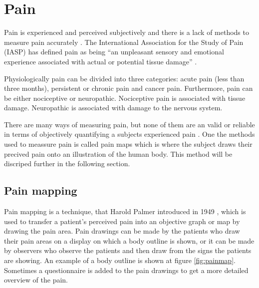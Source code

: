 \section{Pain}
Pain is experienced and perceived subjectively and there is a lack of methods to measure pain accurately \citep{IASP2012, Younger2009}. 
The International Association for the Study of Pain (IASP) has defined pain as being “an unpleasant sensory and emotional experience associated with actual or potential tissue damage” \citep{IASP2012}.

Physiologically pain can be divided into three categories: acute pain (less than three months), persistent or chronic pain and cancer pain. Furthermore, pain can be either nociceptive or neuropathic. Nociceptive pain is associated with tissue damage. Neuropathic is associated with damage to the nervous system.\citep{Briggs2010} 

There are many ways of measuring pain, but none of them are an valid or reliable in terms of objectively quantifying a subjects experienced pain \citep{Younger2009}. One the methods used to meassure pain is called pain maps which is where the subject draws their precived pain onto an illustration of the human body. This method will be discriped further in the following section.   



\subsection{Pain mapping}
Pain mapping is a technique, that Harold Palmer introduced in 1949 \citep{Grunnesjo2006}, which is used to transfer a patient’s perceived pain into an objective graph or map by drawing the pain area. Pain drawings can be made by the patients who draw their pain areas on a display on which a body outline is shown, or it can be made by observers who observe the patients and then draw from the signs the patients are showing. An example of a body outline is shown at figure \ref{fig:painmap}. Sometimes a questionnaire is added to the pain drawings to get a more detailed overview of the pain.\citep{Schott2010}


